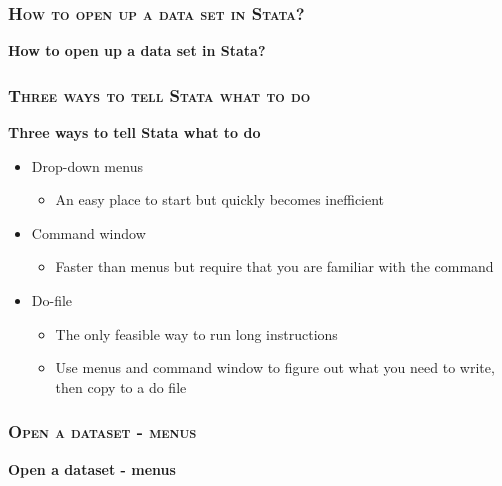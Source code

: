 \documentclass[10pt]{beamer}
\begin{document}
		\begin{frame}

			\frametitle{\textsc{How to open up a data set in Stata?}}
			\begin{center}
				\textbf{How to open up a data set in Stata?} 
			\end{center}

		\end{frame}


		\begin{frame}
			\frametitle{\textsc{Three ways to tell Stata what to do}}
			\begin{center}
				\Large\textbf{Three ways to tell Stata what to do}
			\end{center}
			\begin{itemize}
				\item Drop-down menus
				
				\begin{itemize}
					\item An easy place to start but quickly becomes inefficient
					
				\end{itemize}
				
				\item Command window
				
			\begin{itemize}
				\item Faster than menus but require that you are familiar with the command
				
			\end{itemize}
				\item Do-file
				
			\begin{itemize}
				\item The only feasible way to run long instructions
				
				\item Use menus and command window to figure out what you need to write, then copy to a do file
				
			\end{itemize}
			\end{itemize}
		\end{frame}



		\begin{frame}
			\frametitle{\textsc{Open a dataset - menus}}
			\begin{center}
				\Large\textbf{Open a dataset - menus}
			\end{center}
		\end{frame}
\end{document}
